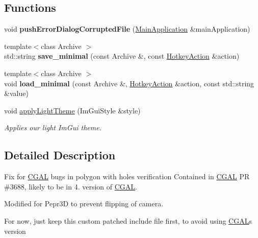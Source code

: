\subsection*{Functions}
\begin{DoxyCompactItemize}
\item 
\mbox{\label{namespacepepr3d_a79317f48d39eac59ce95667b9e34dfff}} 
void {\bfseries push\+Error\+Dialog\+Corrupted\+File} (\mbox{\hyperlink{classpepr3d_1_1_main_application}{Main\+Application}} \&main\+Application)
\item 
\mbox{\label{namespacepepr3d_af6830e663c861adee937b0b975df163b}} 
{\footnotesize template$<$class Archive $>$ }\\std\+::string {\bfseries save\+\_\+minimal} (const Archive \&, const \mbox{\hyperlink{namespacepepr3d_ae35d8dfd4e5925d633f100eb9b525cbe}{Hotkey\+Action}} \&action)
\item 
\mbox{\label{namespacepepr3d_a26eb8960b289e1666eb80f021e4fa885}} 
{\footnotesize template$<$class Archive $>$ }\\void {\bfseries load\+\_\+minimal} (const Archive \&, \mbox{\hyperlink{namespacepepr3d_ae35d8dfd4e5925d633f100eb9b525cbe}{Hotkey\+Action}} \&action, const std\+::string \&value)
\item 
\mbox{\label{namespacepepr3d_a16036d11b930e7d9e9a4d7d285ad7b14}} 
void \mbox{\hyperlink{namespacepepr3d_a16036d11b930e7d9e9a4d7d285ad7b14}{apply\+Light\+Theme}} (Im\+Gui\+Style \&style)
\begin{DoxyCompactList}\small\item\em Applies our light Im\+Gui theme. \end{DoxyCompactList}\end{DoxyCompactItemize}


\subsection{Detailed Description}
Fix for \mbox{\hyperlink{namespace_c_g_a_l}{C\+G\+AL}} bugs in polygon with holes verification Contained in \mbox{\hyperlink{namespace_c_g_a_l}{C\+G\+AL}} PR \#3688, likely to be in 4. version of \mbox{\hyperlink{namespace_c_g_a_l}{C\+G\+AL}}. 

Modified for Pepr3D to prevent flipping of camera.

For now, just keep this custom patched include file first, to avoid using \mbox{\hyperlink{namespace_c_g_a_l}{C\+G\+AL}}\textquotesingle{}s version 